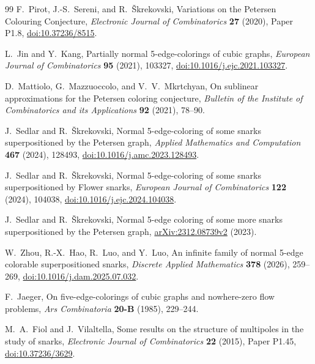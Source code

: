 \documentclass[11pt]{article}
\begin{document}
\begin{thebibliography}{99}
F.~Pirot, J.-S.~Sereni, and R.~\v{S}krekovski,
Variations on the Petersen Colouring Conjecture,
\emph{Electronic Journal of Combinatorics} \textbf{27} (2020), Paper P1.8,
\href{https://doi.org/10.37236/8515}{doi:10.37236/8515}.

L.~Jin and Y.~Kang,
Partially normal 5-edge-colorings of cubic graphs,
\emph{European Journal of Combinatorics} \textbf{95} (2021), 103327,
\href{https://doi.org/10.1016/j.ejc.2021.103327}{doi:10.1016/j.ejc.2021.103327}.

D.~Mattiolo, G.~Mazzuoccolo, and V.~V.~Mkrtchyan,
On sublinear approximations for the Petersen coloring conjecture,
\emph{Bulletin of the Institute of Combinatorics and its Applications}
\textbf{92} (2021), 78--90.

J.~Sedlar and R.~\v{S}krekovski,
Normal 5-edge-coloring of some snarks superpositioned by the Petersen graph,
\emph{Applied Mathematics and Computation} \textbf{467} (2024), 128493,
\href{https://doi.org/10.1016/j.amc.2023.128493}{doi:10.1016/\allowbreak j.amc.2023.128493}.

J.~Sedlar and R.~\v{S}krekovski,
Normal 5-edge-coloring of some snarks superpositioned by Flower snarks,
\emph{European Journal of Combinatorics} \textbf{122} (2024), 104038,
\href{https://doi.org/10.1016/j.ejc.2024.104038}{doi:10.1016/j.ejc.2024.104038}.

J.~Sedlar and R.~\v{S}krekovski,
Normal 5-edge coloring of some more snarks superpositioned by the Petersen graph,
\href{https://arxiv.org/abs/2312.08739v2}{arXiv:2312.08739v2} (2023).

W.~Zhou, R.-X.~Hao, R.~Luo, and Y.~Luo,
An infinite family of normal 5-edge colorable superpositioned snarks,
\emph{Discrete Applied Mathematics} \textbf{378} (2026), 259--269,
\href{https://doi.org/10.1016/j.dam.2025.07.032}{doi:10.1016/\allowbreak j.dam.2025.07.032}.

F.~Jaeger,
On five-edge-colorings of cubic graphs and nowhere-zero flow problems,
\emph{Ars Combinatoria} \textbf{20-B} (1985), 229--244.

M.~A.~Fiol and J.~Vilaltella,
Some results on the structure of multipoles in the study of snarks,
\emph{Electronic Journal of Combinatorics} \textbf{22} (2015), Paper P1.45,
\href{https://doi.org/10.37236/3629}{doi:10.37236/3629}.


\end{thebibliography}
\end{document}
